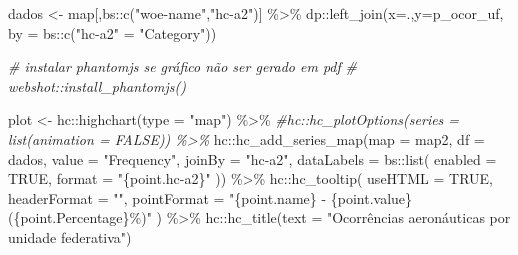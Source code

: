 \documentclass[
]{article}
\newenvironment{Shaded}{\begin{snugshade}}{\end{snugshade}}
\newcommand{\AttributeTok}[1]{\textcolor[rgb]{0.77,0.63,0.00}{#1}}
\newcommand{\CommentTok}[1]{\textcolor[rgb]{0.56,0.35,0.01}{\textit{#1}}}
\newcommand{\ConstantTok}[1]{\textcolor[rgb]{0.00,0.00,0.00}{#1}}
\newcommand{\FunctionTok}[1]{\textcolor[rgb]{0.00,0.00,0.00}{#1}}
\newcommand{\NormalTok}[1]{#1}
\newcommand{\OtherTok}[1]{\textcolor[rgb]{0.56,0.35,0.01}{#1}}
\newcommand{\SpecialCharTok}[1]{\textcolor[rgb]{0.00,0.00,0.00}{#1}}
\newcommand{\StringTok}[1]{\textcolor[rgb]{0.31,0.60,0.02}{#1}}
\begin{document}
\begin{Shaded}
\begin{Highlighting}[]
\NormalTok{dados }\OtherTok{\textless{}{-}}\NormalTok{ map[,bs}\SpecialCharTok{::}\FunctionTok{c}\NormalTok{(}\StringTok{"woe{-}name"}\NormalTok{,}\StringTok{"hc{-}a2"}\NormalTok{)] }\SpecialCharTok{\%\textgreater{}\%} 
\NormalTok{    dp}\SpecialCharTok{::}\FunctionTok{left\_join}\NormalTok{(}\AttributeTok{x=}\NormalTok{.,}\AttributeTok{y=}\NormalTok{p\_ocor\_uf, }\AttributeTok{by =}\NormalTok{ bs}\SpecialCharTok{::}\FunctionTok{c}\NormalTok{(}\StringTok{"hc{-}a2"} \OtherTok{=} \StringTok{"Category"}\NormalTok{))}
\end{Highlighting}
\end{Shaded}

\begin{Shaded}
\begin{Highlighting}[]
\CommentTok{\# instalar phantomjs se gráfico não ser gerado em pdf}
\CommentTok{\# webshot::install\_phantomjs()}


\NormalTok{plot }\OtherTok{\textless{}{-}}\NormalTok{ hc}\SpecialCharTok{::}\FunctionTok{highchart}\NormalTok{(}\AttributeTok{type =} \StringTok{"map"}\NormalTok{) }\SpecialCharTok{\%\textgreater{}\%}
    \CommentTok{\#hc::hc\_plotOptions(series = list(animation = FALSE)) \%\textgreater{}\% }
\NormalTok{  hc}\SpecialCharTok{::}\FunctionTok{hc\_add\_series\_map}\NormalTok{(}\AttributeTok{map =}\NormalTok{ map2,}
                    \AttributeTok{df =}\NormalTok{ dados,}
                    \AttributeTok{value =} \StringTok{"Frequency"}\NormalTok{,}
                    \AttributeTok{joinBy =} \StringTok{"hc{-}a2"}\NormalTok{,}
                        \AttributeTok{dataLabels =}\NormalTok{ bs}\SpecialCharTok{::}\FunctionTok{list}\NormalTok{(}
                          \AttributeTok{enabled =} \ConstantTok{TRUE}\NormalTok{,}
                          \AttributeTok{format =} \StringTok{"\{point.hc{-}a2\}"}
\NormalTok{                          )) }\SpecialCharTok{\%\textgreater{}\%}
\NormalTok{    hc}\SpecialCharTok{::}\FunctionTok{hc\_tooltip}\NormalTok{(}
    \AttributeTok{useHTML =} \ConstantTok{TRUE}\NormalTok{, }\AttributeTok{headerFormat =} \StringTok{""}\NormalTok{,}
    \AttributeTok{pointFormat =} \StringTok{"\{point.name\} {-} \{point.value\} (\{point.Percentage\}\%)"}
\NormalTok{  ) }\SpecialCharTok{\%\textgreater{}\%} 
\NormalTok{  hc}\SpecialCharTok{::}\FunctionTok{hc\_title}\NormalTok{(}\AttributeTok{text =} \StringTok{"Ocorrências aeronáuticas por unidade federativa"}\NormalTok{)}




\end{Highlighting}
\end{Shaded}
\end{document}
